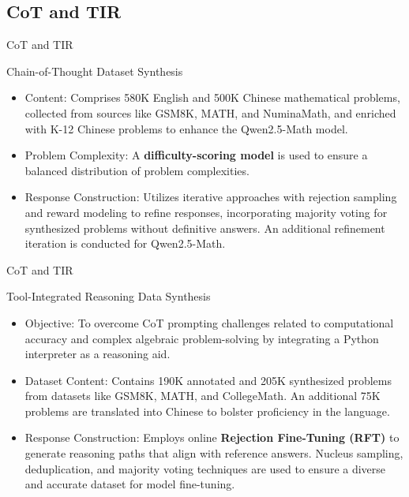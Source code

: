 \documentclass[aspectratio=169]{beamer}
\begin{document}
\subsection{CoT and TIR}
\begin{frame}{CoT and TIR}
	\begin{exampleblock}{Chain-of-Thought Dataset Synthesis}
		\begin{itemize}
			\item Content: Comprises 580K English and 500K Chinese mathematical problems, collected from sources like GSM8K, MATH, and NuminaMath, and enriched with K-12 Chinese problems to enhance the Qwen2.5-Math model.
			      \pause
			\item Problem Complexity: A \textbf{difficulty-scoring model} is used to ensure a balanced distribution of problem complexities.
			      \pause
			\item Response Construction: Utilizes iterative approaches with rejection sampling and reward modeling to refine responses, incorporating majority voting for synthesized problems without definitive answers. An additional refinement iteration is conducted for Qwen2.5-Math.
		\end{itemize}
	\end{exampleblock}
\end{frame}

\begin{frame}{CoT and TIR}
	\begin{exampleblock}{Tool-Integrated Reasoning Data Synthesis}
		\begin{itemize}
			\item Objective: To overcome CoT prompting challenges related to computational accuracy and complex algebraic problem-solving by integrating a Python interpreter as a reasoning aid.
			      \pause
			\item Dataset Content: Contains 190K annotated and 205K synthesized problems from datasets like GSM8K, MATH, and CollegeMath. An additional 75K problems are translated into Chinese to bolster proficiency in the language.
			      \pause
			\item Response Construction: Employs online \textbf{Rejection Fine-Tuning (RFT)} to generate reasoning paths that align with reference answers. Nucleus sampling, deduplication, and majority voting techniques are used to ensure a diverse and accurate dataset for model fine-tuning.
		\end{itemize}
	\end{exampleblock}
\end{frame}
\end{document}
